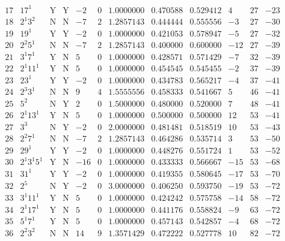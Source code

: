 \documentclass[11pt,reqno,a4letter]{article}
\numberwithin{figure}{section}
\numberwithin{table}{section}
\theoremstyle{plain}
\numberwithin{theorem}{section}
\theoremstyle{definition}
\begin{document}
\begin{table}[h!]
\begin{equation*}
{\begin{array}{cc|cc|ccc|cc|ccc}
 17 & 17^1 & \text{Y} & \text{Y} & -2 & 0 & 1.0000000 & 0.470588 & 0.529412 & 4 & 27 & -23 \\
 18 & 2^1 3^2 & \text{N} & \text{N} & -7 & 2 & 1.2857143 & 0.444444 & 0.555556 & -3 & 27 & -30 \\
 19 & 19^1 & \text{Y} & \text{Y} & -2 & 0 & 1.0000000 & 0.421053 & 0.578947 & -5 & 27 & -32 \\
 20 & 2^2 5^1 & \text{N} & \text{N} & -7 & 2 & 1.2857143 & 0.400000 & 0.600000 & -12 & 27 & -39 \\
 21 & 3^1 7^1 & \text{Y} & \text{N} & 5 & 0 & 1.0000000 & 0.428571 & 0.571429 & -7 & 32 & -39 \\
 22 & 2^1 11^1 & \text{Y} & \text{N} & 5 & 0 & 1.0000000 & 0.454545 & 0.545455 & -2 & 37 & -39 \\
 23 & 23^1 & \text{Y} & \text{Y} & -2 & 0 & 1.0000000 & 0.434783 & 0.565217 & -4 & 37 & -41 \\
 24 & 2^3 3^1 & \text{N} & \text{N} & 9 & 4 & 1.5555556 & 0.458333 & 0.541667 & 5 & 46 & -41 \\
 25 & 5^2 & \text{N} & \text{Y} & 2 & 0 & 1.5000000 & 0.480000 & 0.520000 & 7 & 48 & -41 \\
 26 & 2^1 13^1 & \text{Y} & \text{N} & 5 & 0 & 1.0000000 & 0.500000 & 0.500000 & 12 & 53 & -41 \\
 27 & 3^3 & \text{N} & \text{Y} & -2 & 0 & 2.0000000 & 0.481481 & 0.518519 & 10 & 53 & -43 \\
 28 & 2^2 7^1 & \text{N} & \text{N} & -7 & 2 & 1.2857143 & 0.464286 & 0.535714 & 3 & 53 & -50 \\
 29 & 29^1 & \text{Y} & \text{Y} & -2 & 0 & 1.0000000 & 0.448276 & 0.551724 & 1 & 53 & -52 \\
 30 & 2^1 3^1 5^1 & \text{Y} & \text{N} & -16 & 0 & 1.0000000 & 0.433333 & 0.566667 & -15 & 53 & -68 \\
 31 & 31^1 & \text{Y} & \text{Y} & -2 & 0 & 1.0000000 & 0.419355 & 0.580645 & -17 & 53 & -70 \\
 32 & 2^5 & \text{N} & \text{Y} & -2 & 0 & 3.0000000 & 0.406250 & 0.593750 & -19 & 53 & -72 \\
 33 & 3^1 11^1 & \text{Y} & \text{N} & 5 & 0 & 1.0000000 & 0.424242 & 0.575758 & -14 & 58 & -72 \\
 34 & 2^1 17^1 & \text{Y} & \text{N} & 5 & 0 & 1.0000000 & 0.441176 & 0.558824 & -9 & 63 & -72 \\
 35 & 5^1 7^1 & \text{Y} & \text{N} & 5 & 0 & 1.0000000 & 0.457143 & 0.542857 & -4 & 68 & -72 \\
 36 & 2^2 3^2 & \text{N} & \text{N} & 14 & 9 & 1.3571429 & 0.472222 & 0.527778 & 10 & 82 & -72 \\

\end{array}}
\end{equation*}
\end{table}
\end{document}
